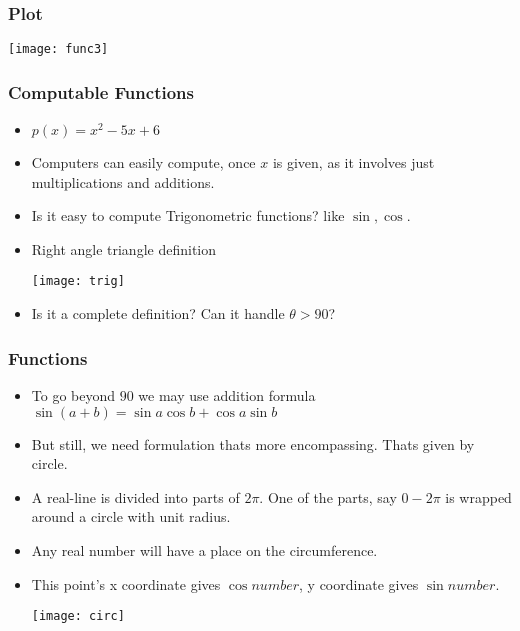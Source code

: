  \begin{frame}[fragile]\frametitle{Plot}
\begin{center}
\texttt{[image: func3]}
\end{center}
\end{frame}


 \begin{frame}[fragile]\frametitle{Computable Functions}
\begin{itemize}
\item $p(x) = x^2 - 5x + 6$
\item Computers can easily compute, once $x$ is given, as it involves just multiplications and additions.
\item Is it easy to compute Trigonometric functions? like $\sin,\cos$.
\item Right angle triangle definition
\begin{center}
\texttt{[image: trig]}
\end{center}
\item Is it a complete definition? Can it handle $\theta > 90$?
\end{itemize}
\end{frame}

 \begin{frame}[fragile]\frametitle{Functions}
\begin{itemize}
\item To go beyond $90$ we may use addition formula $\sin(a+b) = \sin a \cos b + \cos a \sin b$
\item But still, we need formulation thats more encompassing. Thats given by circle.
\item A real-line is divided into parts of $2\pi$. One of the parts, say $0-2\pi$ is wrapped around a circle with unit radius.
\item Any real number will have a place on the circumference.
\item This point's x coordinate gives $\cos number$, y coordinate gives $\sin number$.
\begin{center}
\texttt{[image: circ]}
\end{center}
\end{itemize}
\end{frame}


